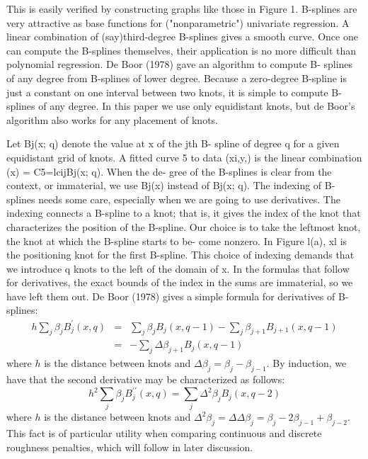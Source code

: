 \documentclass[12pt]{article}
\begin{document}
{This is easily verified by constructing graphs like those in Figure 1.
B-splines are very attractive as base functions for ("nonparametric") univariate regression. A linear combination of (say)third-degree B-splines gives a smooth curve. Once one can compute the B-splines themselves, their application is no more difficult than polynomial regression.
De Boor (1978) gave an algorithm to compute B- splines of any degree from B-splines of lower degree. Because a zero-degree B-spline is just a constant on one interval between two knots, it is simple to compute B-splines of any degree. In this paper we use only equidistant knots, but de Boor's algorithm also works for any placement of knots.

Let Bj(x; q) denote the value at x of the jth B- spline of degree q for a given equidistant grid of knots. A fitted curve 5 to data (xi,y,) is the linear combination (x) = C5=lcijBj(x; q). When the de- gree of the B-splines is clear from the context, or immaterial, we use Bj(x) instead of Bj(x; q).
The indexing of B-splines needs some care, especially when we are going to use derivatives. The indexing connects a B-spline to a knot; that is, it gives the index of the knot that characterizes the position of the B-spline. Our choice is to take the leftmost knot, the knot at which the B-spline starts to be- come nonzero. In Figure l(a), xl is the positioning knot for the first B-spline. This choice of indexing demands that we introduce q knots to the left of the domain of x. In the formulas that follow for derivatives, the exact bounds of the index in the sums are immaterial, so we have left them out.
De Boor (1978) gives a simple formula for derivatives of B-splines:
\begin{eqnarray}
h\sum_{j} \beta_j B_j^\prime \left(x,q\right) &=& \sum_{j} \beta_j B_j\left(x,q-1\right)-\sum_{j} \beta_{j+1} B_{j+1} \left(x,q-1\right) \nonumber \\ 
&=& -\sum_{j} \Delta\beta_{j+1} B_{j} \left(x,q-1\right) \label{bspline_deriv}
\end{eqnarray}
\noindent
where $h$ is the distance between knots and $\Delta \beta_j = \beta_j-\beta_{j-1}$. By induction, we have that the second derivative may be characterized as follows:
\begin{equation}
h^2\sum_{j} \beta_j B_j^{\prime \prime} \left(x,q\right) = \sum_{j} \Delta^2 \beta_{j} B_{j} \left(x,q-2\right) \label{bspline_2nd_deriv}
\end{equation}
\noindent
where $h$ is the distance between knots and $\Delta^2 \beta_j = \Delta\Delta \beta_j = \beta_j - 2\beta_{j-1}+\beta_{j-2} $. This fact is of particular utility when comparing continuous and discrete roughness penalties, which will follow in later discussion.

}
\end{document}
